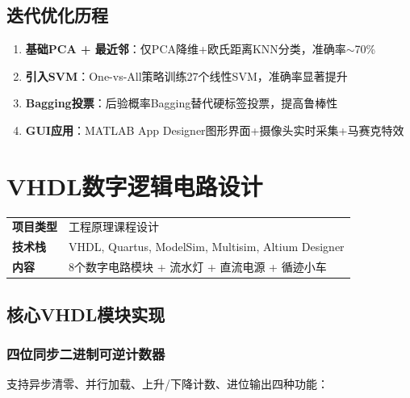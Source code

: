 \documentclass[12pt,a4paper]{ctexart}
\begin{document}
\subsection{迭代优化历程}

\begin{iterbox}[版本迭代]
\begin{enumerate}[label=\textbf{V\arabic*}:, leftmargin=3em]
    \item \textbf{基础PCA + 最近邻}：仅PCA降维+欧氏距离KNN分类，准确率$\sim$70\%
    \item \textbf{引入SVM}：One-vs-All策略训练27个线性SVM，准确率显著提升
    \item \textbf{Bagging投票}：后验概率Bagging替代硬标签投票，提高鲁棒性
    \item \textbf{GUI应用}：MATLAB App Designer图形界面+摄像头实时采集+马赛克特效
\end{enumerate}
\end{iterbox}

\newpage
\section{VHDL数字逻辑电路设计}

\begin{infobox}[项目概况]
\begin{tabular}{ll}
\textbf{项目类型} & 工程原理课程设计 \\
\textbf{技术栈}   & VHDL, Quartus, ModelSim, Multisim, Altium Designer \\
\textbf{内容}     & 8个数字电路模块 + 流水灯 + 直流电源 + 循迹小车
\end{tabular}
\end{infobox}

\subsection{核心VHDL模块实现}

\subsubsection{四位同步二进制可逆计数器}

支持异步清零、并行加载、上升/下降计数、进位输出四种功能：
\end{document}
